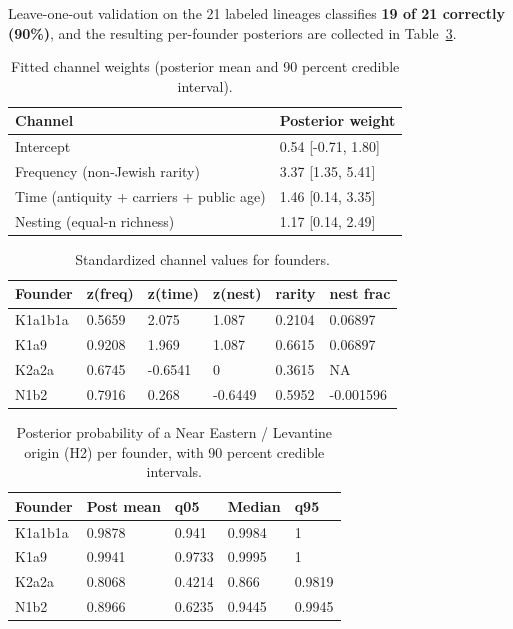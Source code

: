 \documentclass[11pt]{article}
\begin{document}
Leave-one-out validation on the 21 labeled lineages classifies \textbf{19 of 21 correctly (90\%)}, and the resulting per-founder posteriors are collected in Table~\ref{tab:bayes}.

\begin{table}[htbp]
\centering
\small
\caption{Fitted channel weights (posterior mean and 90 percent credible interval).}
\label{tab:fcoef}
\begin{tabular}{ll}
\toprule
Channel & Posterior weight \\
\midrule
Intercept & 0.54 [-0.71, 1.80] \\
Frequency (non-Jewish rarity) & 3.37 [1.35, 5.41] \\
Time (antiquity + carriers + public age) & 1.46 [0.14, 3.35] \\
Nesting (equal-n richness) & 1.17 [0.14, 2.49] \\
\bottomrule
\end{tabular}
\end{table}
\begin{table}[htbp]
\centering
\footnotesize
\caption{Standardized channel values for founders.}
\label{tab:bscore}
\begin{tabular}{llllll}
\toprule
Founder & z(freq) & z(time) & z(nest) & rarity & nest frac \\
\midrule
K1a1b1a & 0.5659 & 2.075 & 1.087 & 0.2104 & 0.06897 \\
K1a9 & 0.9208 & 1.969 & 1.087 & 0.6615 & 0.06897 \\
K2a2a & 0.6745 & -0.6541 & 0 & 0.3615 &    NA \\
N1b2 & 0.7916 & 0.268 & -0.6449 & 0.5952 & -0.001596 \\
\bottomrule
\end{tabular}
\end{table}
\begin{table}[htbp]
\centering
\small
\caption{Posterior probability of a Near Eastern / Levantine origin (H2) per founder, with 90 percent credible intervals.}
\label{tab:bayes}
\begin{tabular}{lllll}
\toprule
Founder & Post mean & q05 & Median & q95 \\
\midrule
K1a1b1a & 0.9878 & 0.941 & 0.9984 &     1 \\
K1a9 & 0.9941 & 0.9733 & 0.9995 &     1 \\
K2a2a & 0.8068 & 0.4214 & 0.866 & 0.9819 \\
N1b2 & 0.8966 & 0.6235 & 0.9445 & 0.9945 \\
\bottomrule
\end{tabular}
\end{table}
\end{document}
